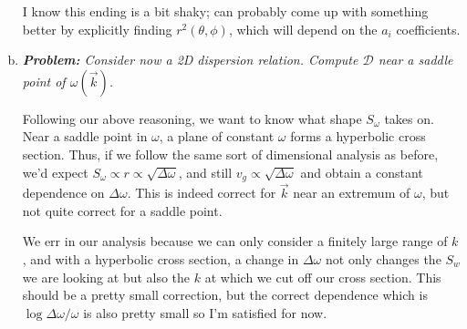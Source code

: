 \documentclass[10pt]{article}
\begin{document}
\begin{enumerate}[(a)]
        I know this ending is a bit shaky; can probably come up with something
        better by explicitly finding $r^2(\theta,\phi)$, which will depend on
        the $a_i$ coefficients.

    \item \emph{\textbf{Problem:} Consider now a 2D dispersion relation. Compute
        $\mathcal{D}$ near a saddle point of $\omega(\vec{k})$.}

        Following our above reasoning, we want to know what shape $S_\omega$
        takes on. Near a saddle point in $\omega$, a plane of constant $\omega$
        forms a hyperbolic cross section. Thus, if we follow the same sort of
        dimensional analysis as before, we'd expect $S_\omega \propto r \propto
        \sqrt{\Delta \omega}$, and still $v_g \propto \sqrt{\Delta \omega}$ and
        obtain a constant dependence on $\Delta \omega$. This is indeed correct
        for $\vec{k}$ near an extremum of $\omega$, but not quite correct for a
        saddle point.

        We err in our analysis because we can only consider a finitely large
        range of $k$, and with a hyperbolic cross section, a change in $\Delta
        \omega$ not only changes the $S_w$ we are looking at but also the $k$ at
        which we cut off our cross section. This should be a pretty small
        correction, but the correct dependence which is $\log \Delta
        \omega/\omega$ is also pretty small so I'm satisfied for now.
\end{enumerate}
\end{document}
